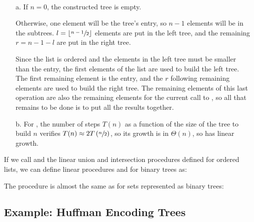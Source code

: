 \begin{exe}[2.64]
    \ \vspace{-20pt}
    \begin{itemize}
        \item[a.] If $n = 0$, the constructed tree is empty.

            Otherwise, one element will be the tree’s entry, so $n - 1$ elements 
            will be in the subtrees.
            $l = \lfloor \sfrac{n - 1}{2}\rfloor$ elements are put in the left 
            tree, and the remaining $r = n - 1 - l$ are put in the right tree.

            Since the list is ordered and the elements in the left tree must be 
            smaller than the entry, the first elements of the list are used to 
            build the left tree. The first remaining element is the entry, and 
            the $r$ following remaining elements are used to build the right 
            tree. The remaining elements of this last operation are also the 
            remaining elements for the current call to , so 
            all that remains to be done is to put all the results together.

        \item[b.] For , the number of steps $T(n)$ as 
            a function of the size of the tree to build $n$ verifies
            $T(n) \approx 2 T\left(\sfrac{n}{2}\right)$, so its growth is in 
            $\Theta(n)$, so  has linear growth.
    \end{itemize}
\end{exe}

\begin{exe}[2.65]
    If we call  and 
     the linear union and intersection 
    procedures defined for ordered lists, we can define linear procedures 
     and  for binary trees as:
\end{exe}

\begin{exe}[2.66]
    The procedure is almost the same as  for sets 
    represented as binary trees:
\end{exe}

\subsection{Example: Huffman Encoding Trees}


